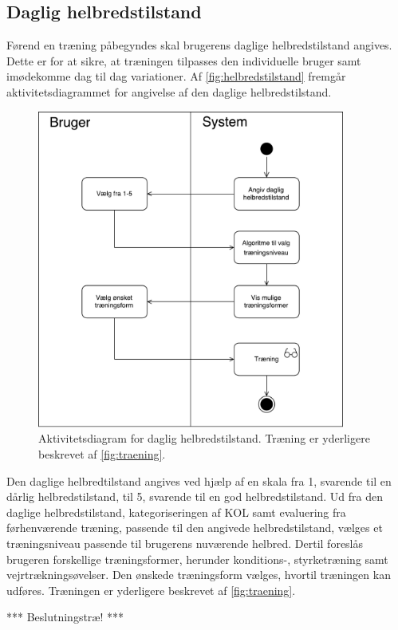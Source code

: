 \subsection*{Daglig helbredstilstand}
Førend en træning påbegyndes skal brugerens daglige helbredstilstand angives. Dette er for at sikre, at træningen tilpasses den individuelle bruger samt imødekomme dag til dag variationer. Af \autoref{fig:helbredstilstand} fremgår aktivitetsdiagrammet for angivelse af den daglige helbredstilstand. 

\begin{figure} [H]
\centering
\includegraphics[width=0.9\textwidth]{figures/aktivitetsdiagram/Helbredstilstand}
\caption{Aktivitetsdiagram for daglig helbredstilstand. Træning er yderligere beskrevet af \autoref{fig:traening}.}
\label{fig:helbredstilstand}
\end{figure}

\noindent
Den daglige helbredtilstand angives ved hjælp af en skala fra 1, svarende til en dårlig helbredstilstand, til 5, svarende til en god helbredstilstand. Ud fra den daglige helbredstilstand, kategoriseringen af KOL samt evaluering fra førhenværende træning, passende til den angivede helbredstilstand, vælges et træningsniveau passende til brugerens nuværende helbred. Dertil foreslås brugeren forskellige træningsformer, herunder konditions-, styrketræning samt vejrtrækningsøvelser. Den ønskede træningsform vælges, hvortil træningen kan udføres. Træningen er yderligere beskrevet af \autoref{fig:traening}. 


*** Beslutningstræ! ***